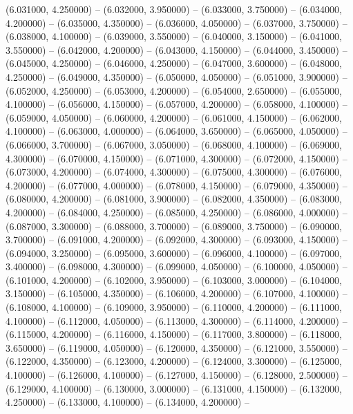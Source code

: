 (6.031000, 4.250000) -- 
(6.032000, 3.950000) -- 
(6.033000, 3.750000) -- 
(6.034000, 4.200000) -- 
(6.035000, 4.350000) -- 
(6.036000, 4.050000) -- 
(6.037000, 3.750000) -- 
(6.038000, 4.100000) -- 
(6.039000, 3.550000) -- 
(6.040000, 3.150000) -- 
(6.041000, 3.550000) -- 
(6.042000, 4.200000) -- 
(6.043000, 4.150000) -- 
(6.044000, 3.450000) -- 
(6.045000, 4.250000) -- 
(6.046000, 4.250000) -- 
(6.047000, 3.600000) -- 
(6.048000, 4.250000) -- 
(6.049000, 4.350000) -- 
(6.050000, 4.050000) -- 
(6.051000, 3.900000) -- 
(6.052000, 4.250000) -- 
(6.053000, 4.200000) -- 
(6.054000, 2.650000) -- 
(6.055000, 4.100000) -- 
(6.056000, 4.150000) -- 
(6.057000, 4.200000) -- 
(6.058000, 4.100000) -- 
(6.059000, 4.050000) -- 
(6.060000, 4.200000) -- 
(6.061000, 4.150000) -- 
(6.062000, 4.100000) -- 
(6.063000, 4.000000) -- 
(6.064000, 3.650000) -- 
(6.065000, 4.050000) -- 
(6.066000, 3.700000) -- 
(6.067000, 3.050000) -- 
(6.068000, 4.100000) -- 
(6.069000, 4.300000) -- 
(6.070000, 4.150000) -- 
(6.071000, 4.300000) -- 
(6.072000, 4.150000) -- 
(6.073000, 4.200000) -- 
(6.074000, 4.300000) -- 
(6.075000, 4.300000) -- 
(6.076000, 4.200000) -- 
(6.077000, 4.000000) -- 
(6.078000, 4.150000) -- 
(6.079000, 4.350000) -- 
(6.080000, 4.200000) -- 
(6.081000, 3.900000) -- 
(6.082000, 4.350000) -- 
(6.083000, 4.200000) -- 
(6.084000, 4.250000) -- 
(6.085000, 4.250000) -- 
(6.086000, 4.000000) -- 
(6.087000, 3.300000) -- 
(6.088000, 3.700000) -- 
(6.089000, 3.750000) -- 
(6.090000, 3.700000) -- 
(6.091000, 4.200000) -- 
(6.092000, 4.300000) -- 
(6.093000, 4.150000) -- 
(6.094000, 3.250000) -- 
(6.095000, 3.600000) -- 
(6.096000, 4.100000) -- 
(6.097000, 3.400000) -- 
(6.098000, 4.300000) -- 
(6.099000, 4.050000) -- 
(6.100000, 4.050000) -- 
(6.101000, 4.200000) -- 
(6.102000, 3.950000) -- 
(6.103000, 3.000000) -- 
(6.104000, 3.150000) -- 
(6.105000, 4.350000) -- 
(6.106000, 4.200000) -- 
(6.107000, 4.100000) -- 
(6.108000, 4.100000) -- 
(6.109000, 3.950000) -- 
(6.110000, 4.200000) -- 
(6.111000, 4.100000) -- 
(6.112000, 4.050000) -- 
(6.113000, 4.300000) -- 
(6.114000, 4.200000) -- 
(6.115000, 4.200000) -- 
(6.116000, 4.150000) -- 
(6.117000, 3.800000) -- 
(6.118000, 3.650000) -- 
(6.119000, 4.050000) -- 
(6.120000, 4.350000) -- 
(6.121000, 3.550000) -- 
(6.122000, 4.350000) -- 
(6.123000, 4.200000) -- 
(6.124000, 3.300000) -- 
(6.125000, 4.100000) -- 
(6.126000, 4.100000) -- 
(6.127000, 4.150000) -- 
(6.128000, 2.500000) -- 
(6.129000, 4.100000) -- 
(6.130000, 3.000000) -- 
(6.131000, 4.150000) -- 
(6.132000, 4.250000) -- 
(6.133000, 4.100000) -- 
(6.134000, 4.200000) -- 
